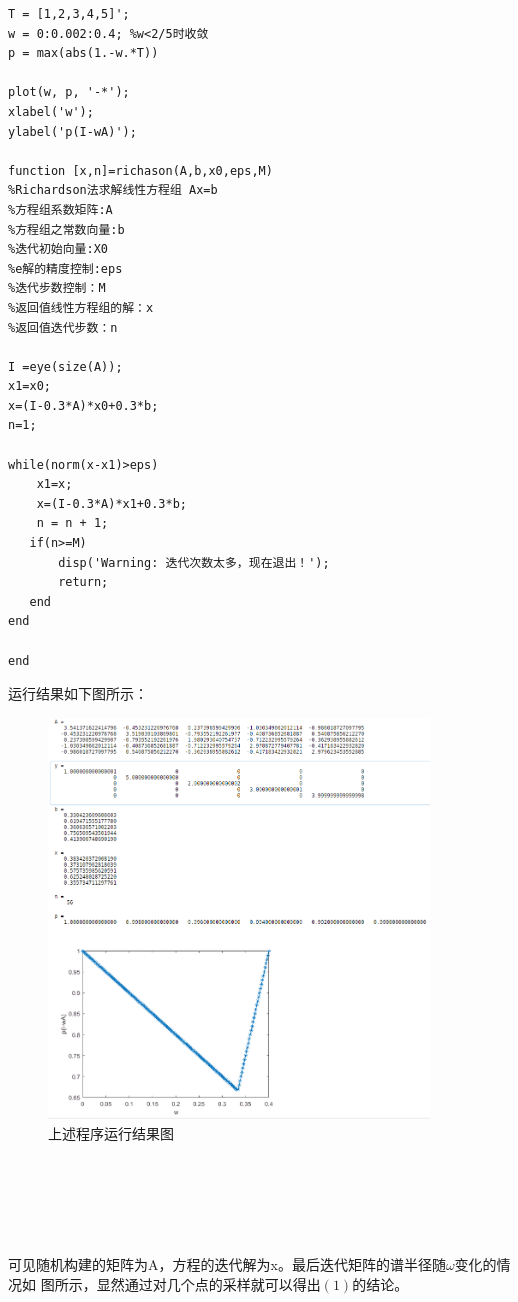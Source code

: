 \documentclass[12pt,a4paper,utf8]{ctexart}
\begin{document}
\begin{enumerate}
\begin{enumerate}
\begin{lstlisting}[frame=single]
%以下求w和谱半径之间的关系
T = [1,2,3,4,5]';
w = 0:0.002:0.4; %w<2/5时收敛
p = max(abs(1.-w.*T))

plot(w, p, '-*');
xlabel('w');
ylabel('p(I-wA)');

function [x,n]=richason(A,b,x0,eps,M)
%Richardson法求解线性方程组 Ax=b
%方程组系数矩阵:A
%方程组之常数向量:b
%迭代初始向量:X0
%e解的精度控制:eps
%迭代步数控制：M
%返回值线性方程组的解：x
%返回值迭代步数：n

I =eye(size(A));
x1=x0;
x=(I-0.3*A)*x0+0.3*b;
n=1;

while(norm(x-x1)>eps)
    x1=x;
    x=(I-0.3*A)*x1+0.3*b;
    n = n + 1;
   if(n>=M)
       disp('Warning: 迭代次数太多，现在退出！');
       return;
   end
end

end
        \end{lstlisting}
            运行结果如下图所示：\\
            \begin{figure}[h]
                \centering
                \includegraphics[width=0.9\textwidth]{H3T2C.png}
                \caption{上述程序运行结果图}
            \end{figure}\\
            \\
            \\
            \\
            \\
            可见随机构建的矩阵为A，方程的迭代解为x。最后迭代矩阵的谱半径随$\omega$变化的情况如
            图所示，显然通过对几个点的采样就可以得出$(1)$的结论。


\end{enumerate}
\end{enumerate}
\end{document}
